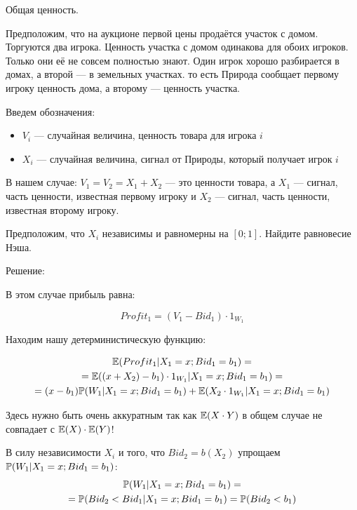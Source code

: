 \begin{myex} Общая ценность.

Предположим, что на аукционе первой цены продаётся участок с домом. Торгуются два игрока. Ценность участка с домом одинакова для обоих игроков. Только они её не совсем полностью знают. Один игрок хорошо разбирается в домах, а второй — в земельных участках. то есть Природа сообщает первому игроку ценность дома, а второму — ценность участка.

Введем обозначения:

\begin{itemize}
\item $ V_{i} $ — случайная величина, ценность товара для игрока $ i $
\item $ X_{i} $ — случайная величина, сигнал от Природы, который получает игрок $ i $
\end{itemize}

В нашем случае: $ V_{1}=V_{2}=X_{1}+X_{2} $ — это ценности товара, а $ X_{1} $ — сигнал, часть ценности, известная первому игроку и $ X_{2} $ — сигнал, часть ценности, известная второму игроку.

Предположим, что $ X_{i} $ независимы и равномерны на $ [0;1] $. Найдите равновесие Нэша.

Решение:

В этом случае прибыль равна:

\begin{equation}
Profit_{1}=(V_{1}-Bid_{1})\cdot 1_{W_{1}}
\end{equation}

Находим нашу детерминистическую функцию:

\begin{multline}
\E(Profit_{1}|X_{1}=x; Bid_{1}=b_{1})=\\
=\E((x+X_{2})-b_{1})\cdot 1_{W_{1}}|X_{1}=x; Bid_{1}=b_{1})=\\
=(x-b_{1})\P(W_{1}|X_{1}=x; Bid_{1}=b_{1})+\E(X_{2}\cdot 1_{W_{1}}|X_{1}=x; Bid_{1}=b_{1})
\end{multline}


Здесь нужно быть очень аккуратным так как $ \E(X\cdot Y) $ в общем случае не совпадает с $ \E(X)\cdot \E(Y) $!

В силу независимости $ X_{i} $ и того, что $ Bid_{2}=b(X_{2}) $ упрощаем $\P(W_{1}|X_{1}=x ; Bid_{1}=b_{1})$:
\begin{multline}
\P(W_{1}|X_{1}=x; Bid_{1}=b_{1})=\\
=\P(Bid_{2}<Bid_{1}|X_{1}=x; Bid_{1}=b_{1})=\P(Bid_{2}<b_{1})
\end{multline}


\end{myex}
